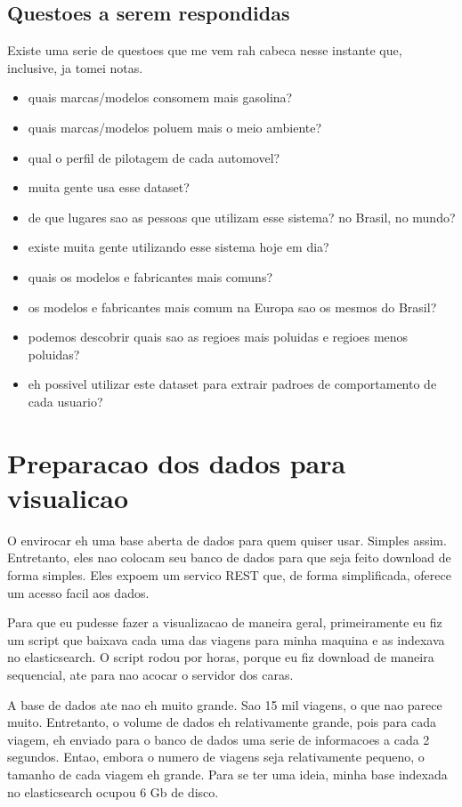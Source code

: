\documentclass[10pt, conference]{IEEEtran}
\begin{document}
\subsection{Questoes a serem respondidas}
Existe uma serie de questoes que me vem rah cabeca nesse instante que,
inclusive, ja tomei notas.

\begin{itemize}
  \item quais marcas/modelos consomem mais gasolina?
  \item quais marcas/modelos poluem mais o meio ambiente?
  \item qual o perfil de pilotagem de cada automovel?
  \item muita gente usa esse dataset?
  \item de que lugares sao as pessoas que utilizam esse sistema? no Brasil, no mundo?
  \item existe muita gente utilizando esse sistema hoje em dia?
  \item quais os modelos e fabricantes mais comuns?
  \item os modelos e fabricantes mais comum na Europa sao os mesmos do Brasil?
  \item podemos descobrir quais sao as regioes mais poluidas e regioes menos poluidas?
  \item eh possivel utilizar este dataset para extrair padroes de comportamento de cada usuario?
\end{itemize}




\section{Preparacao dos dados para visualicao}

O envirocar eh uma base aberta de dados para quem quiser usar. Simples assim. Entretanto,
eles nao colocam seu banco de dados para que seja feito download de forma simples. Eles 
expoem um servico REST que, de forma simplificada, oferece um acesso facil aos dados.

Para que eu pudesse fazer a visualizacao de maneira geral, primeiramente eu fiz um script
que baixava cada uma das viagens para minha maquina e as indexava no elasticsearch. O script
rodou por horas, porque eu fiz download de maneira sequencial, ate para nao acocar o servidor
dos caras.

A base de dados ate nao eh muito grande. Sao 15 mil viagens, o que nao parece muito. Entretanto,
o volume de dados eh relativamente grande, pois para cada viagem, eh enviado para o banco de dados
uma serie de informacoes a cada 2 segundos. Entao, embora o numero de viagens seja relativamente 
pequeno, o tamanho de cada viagem eh grande. Para se ter uma ideia, minha base indexada no elasticsearch 
ocupou 6 Gb de disco.
\end{document}
